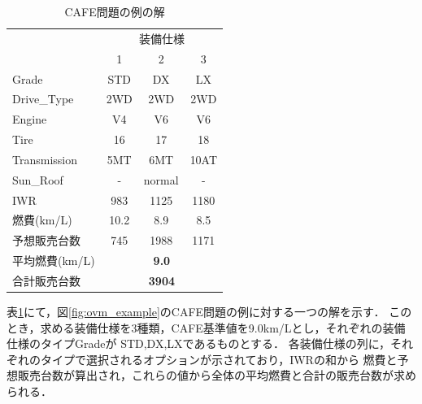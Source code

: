 \begin{table}[tb]
 \caption{CAFE問題の例の解}
 \begin{tabular}{l|c|c|c} \bhline
    \multicolumn{1}{c|}{装備}   & \multicolumn{3}{c}{装備仕様} \\ \cline{2-4}
                 & 1	& 2 	 & 3	\\  \hline
    Grade	 & STD	& DX	 & LX	\\
    Drive\_Type  & 2WD  & 2WD    & 2WD  \\
    Engine	 & V4	& V6	 & V6	\\
    Tire	 & 16	& 17	 & 18	\\
    Transmission & 5MT	& 6MT    & 10AT	\\
    Sun\_Roof    & -    & normal & -    \\ \hline
    IWR          & 983  & 1125   & 1180 \\ %
    燃費(km/L)    & 10.2  & 8.9     & 8.5 \\ %
    予想販売台数  & 745  & 1988   & 1171  \\ \hline
    平均燃費(km/L) & \multicolumn{3}{c}{\bf{9.0}} \\ 
    合計販売台数  & \multicolumn{3}{c}{\bf{3904}} \\ \hline
 \end{tabular}
 \label{tab:ovm_ans}
\end{table}

表\ref{tab:ovm_ans}にて，図\ref{fig:ovm_example}のCAFE問題の例に対する一つの解を示す．
このとき，求める装備仕様を3種類，CAFE基準値を9.0km/Lとし，それぞれの装備仕様のタイプGradeが
STD,DX,LXであるものとする．
各装備仕様の列に，それぞれのタイプで選択されるオプションが示されており，IWRの和から
燃費と予想販売台数が算出され，これらの値から全体の平均燃費と合計の販売台数が求められる．






